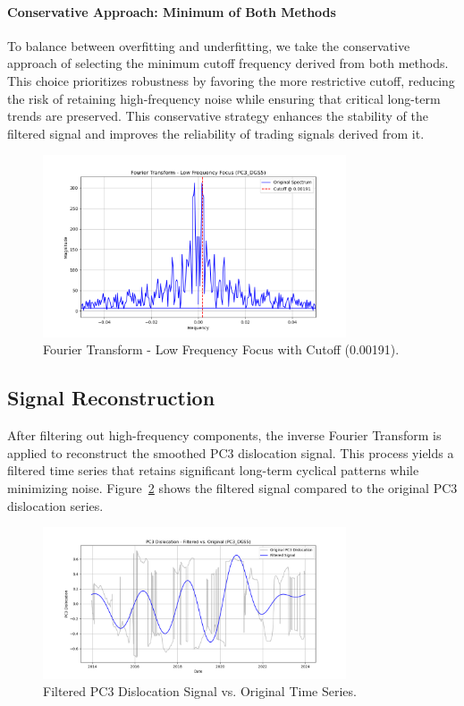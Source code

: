\documentclass[12pt]{article}
\begin{document}
\paragraph{Conservative Approach: Minimum of Both Methods}
To balance between overfitting and underfitting, we take the conservative approach of selecting the minimum cutoff frequency derived from both methods. This choice prioritizes robustness by favoring the more restrictive cutoff, reducing the risk of retaining high-frequency noise while ensuring that critical long-term trends are preserved. This conservative strategy enhances the stability of the filtered signal and improves the reliability of trading signals derived from it.

\begin{figure}[H]
    \centering
    \includegraphics[width=0.8\textwidth]{visuals/fourier_zoomed_spectrum.png}
    \caption{Fourier Transform - Low Frequency Focus with Cutoff (0.00191).}
    \label{fig:zoomspectrum}
\end{figure}



\subsection{Signal Reconstruction}
After filtering out high-frequency components, the inverse Fourier Transform is applied to reconstruct the smoothed PC3 dislocation signal. This process yields a filtered time series that retains significant long-term cyclical patterns while minimizing noise. Figure~\ref{fig:filtered} shows the filtered signal compared to the original PC3 dislocation series.

\begin{figure}[H]
    \centering
    \includegraphics[width=0.8\textwidth]{visuals/fourier_filtered_signal.png}
    \caption{Filtered PC3 Dislocation Signal vs. Original Time Series.}
    \label{fig:filtered}
\end{figure}
\end{document}
